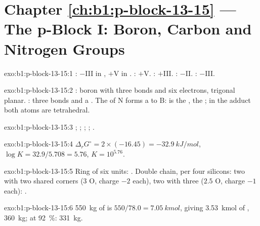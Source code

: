 \section*{Chapter \ref{ch:b1:p-block-13-15} --- The p-Block I: Boron, Carbon and Nitrogen Groups}

\begin{solution}{exo:b1:p-block-13-15:1}
: $-$III in , $+$V in . : $+$V.
: $+$III. : $-$II. : $-$III.
\end{solution}

\begin{solution}{exo:b1:p-block-13-15:2}
: boron with three bonds and six electrons, trigonal planar.
: three bonds and a . The  of N forms a  to B:  is the ,  the ; in the
adduct both atoms are tetrahedral.
\end{solution}

\begin{solution}{exo:b1:p-block-13-15:3}
; ;
; ;
.
\end{solution}

\begin{solution}{exo:b1:p-block-13-15:4}
$\Delta_r G^\circ = 2 \times (-16.45) = \qty{-32.9}{kJ/mol}$, $\log K =
32.9/5.708 = 5.76$, $K = 10^{5.76}$.
\end{solution}

\begin{solution}{exo:b1:p-block-13-15:5}
Ring of six  units: . Double chain, per four
silicons: two with two shared corners (3 O, charge $-2$ each), two with
three ($2.5$ O, charge $-1$ each): .
\end{solution}

\begin{solution}{exo:b1:p-block-13-15:6}
\qty{550}{kg} of  is $550/78.0 = \qty{7.05}{kmol}$, giving
\qty{3.53}{kmol} of , \qty{360}{kg}; at \qty{92}{\percent}:
\qty{331}{kg}.
\end{solution}

